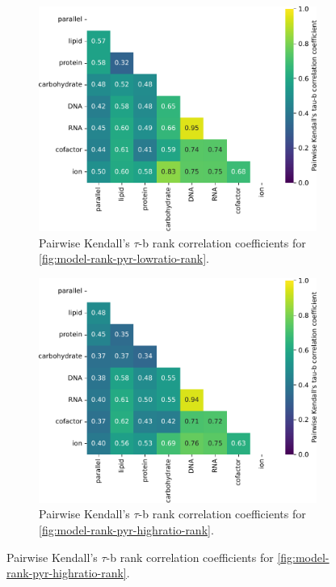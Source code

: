 \begin{figure}
  \begin{subfigure}[t]{0.45\textwidth}
  \centering
    \includegraphics[width=\linewidth]{CompareEnzUse_glc00p00_pyr08p89_ammUnres_2.pdf}
    \caption{
      Pairwise Kendall's $\tau$-b rank correlation coefficients for \ref{fig:model-rank-pyr-lowratio-rank}.
    }
    \label{fig:model-rank-pyr-lowratio-kendall}
  \end{subfigure}%
  \begin{subfigure}[t]{0.45\textwidth}
  \centering
    \includegraphics[width=\linewidth]{CompareEnzUse_glc00p00_pyr03p73_amm00p90_2.pdf}
    \caption{
      Pairwise Kendall's $\tau$-b rank correlation coefficients for \ref{fig:model-rank-pyr-highratio-rank}.
    }
    \label{fig:model-rank-pyr-highratio-kendall}
  \end{subfigure}


\end{figure}
